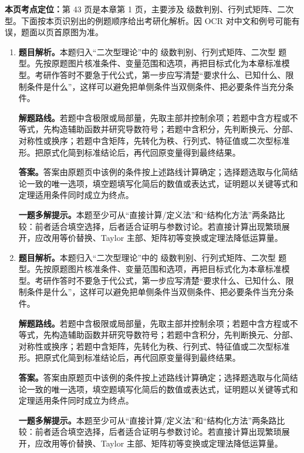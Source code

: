 \begin{solutionblock}
\textbf{本页考点定位：}第 43 页是本章第 1 页，主要涉及 级数判别、行列式矩阵、二次型。下面按本页识别出的例题顺序给出考研化解析。因 OCR 对中文和例号可能有误，题面以页首原图为准。

\begin{enumerate}[label=\textbf{例\arabic*.}, leftmargin=2.4em]

\item \textbf{题目解析。}本题归入“二次型理论”中的 级数判别、行列式矩阵、二次型 题型。先按原题图片核准条件、变量范围和选项，再把目标式化为本章标准模型。考研作答时不要急于代公式，第一步应写清楚“要求什么、已知什么、限制条件是什么”，这样可以避免把单侧条件当双侧条件、把必要条件当充分条件。

\textbf{解题路线。}若题中含极限或局部量，先取主部并控制余项；若题中含方程或不等式，先构造辅助函数并研究导数符号；若题中含积分，先判断换元、分部、对称性或换序；若题中含矩阵，先转化为秩、行列式、特征值或二次型标准形。把原式化简到标准结论后，再代回原变量得到最终结果。

\textbf{答案。}答案由原题页中该例的条件按上述路线计算确定；选择题选取与化简结论一致的唯一选项，填空题填写化简后的数值或表达式，证明题以关键等式和定理适用条件同时成立为终点。

\textbf{一题多解提示。}本题至少可从“直接计算/定义法”和“结构化方法”两条路比较：前者适合填空选择，后者适合证明与参数讨论。若直接计算出现繁琐展开，应改用等价替换、Taylor 主部、矩阵初等变换或定理法降低运算量。

\item \textbf{题目解析。}本题归入“二次型理论”中的 级数判别、行列式矩阵、二次型 题型。先按原题图片核准条件、变量范围和选项，再把目标式化为本章标准模型。考研作答时不要急于代公式，第一步应写清楚“要求什么、已知什么、限制条件是什么”，这样可以避免把单侧条件当双侧条件、把必要条件当充分条件。

\textbf{解题路线。}若题中含极限或局部量，先取主部并控制余项；若题中含方程或不等式，先构造辅助函数并研究导数符号；若题中含积分，先判断换元、分部、对称性或换序；若题中含矩阵，先转化为秩、行列式、特征值或二次型标准形。把原式化简到标准结论后，再代回原变量得到最终结果。

\textbf{答案。}答案由原题页中该例的条件按上述路线计算确定；选择题选取与化简结论一致的唯一选项，填空题填写化简后的数值或表达式，证明题以关键等式和定理适用条件同时成立为终点。

\textbf{一题多解提示。}本题至少可从“直接计算/定义法”和“结构化方法”两条路比较：前者适合填空选择，后者适合证明与参数讨论。若直接计算出现繁琐展开，应改用等价替换、Taylor 主部、矩阵初等变换或定理法降低运算量。

\end{enumerate}
\end{solutionblock}



